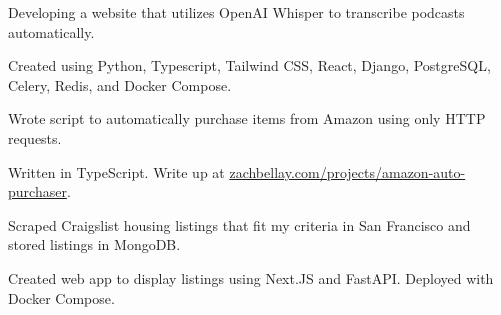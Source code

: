 \documentclass[]{deedy-resume-openfont}
\begin{document}
\hfill{}
\begin{tightemize}
\item Developing a website that utilizes OpenAI Whisper to transcribe podcasts automatically.
\item Created using Python, Typescript, Tailwind CSS, React, Django, PostgreSQL, Celery, Redis, and Docker Compose.
\end{tightemize}
\sectionsep




\hfill{}

\begin{tightemize}
\item Wrote script to automatically purchase items from Amazon using only HTTP requests.
\item Written in TypeScript. Write up at \href{https://zachbellay.com/projects/amazon-auto-purchaser}{zachbellay.com/projects/amazon-auto-purchaser}.
\end{tightemize}
\sectionsep

\hfill{}

\begin{tightemize}
\item Scraped Craigslist housing listings that fit my criteria in San Francisco and stored listings in MongoDB.
\item Created web app to display listings using Next.JS and FastAPI. Deployed with Docker Compose.
\end{tightemize}
\sectionsep
\end{document}
